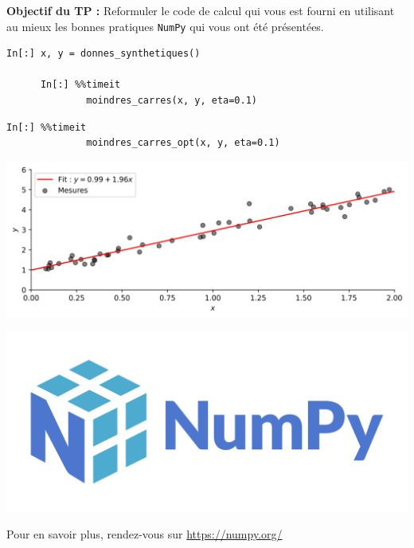 \documentclass[aspectratio=169]{beamer}
\begin{document}
\begin{frame}
  \vfill
  \textbf{Objectif du TP :} Reformuler le code de calcul qui vous est fourni en utilisant au mieux les bonnes pratiques \texttt{NumPy} qui vous ont été présentées.
  \vfill
\end{frame}




{
  \begin{frame}[fragile]{}{}
    \vfill
    \begin{lstlisting}[backgroundcolor=\color{white}, basicstyle=\ttfamily\footnotesize\color{black}]
      In[:] x, y = donnes_synthetiques()
      
      In[:] %%timeit
              moindres_carres(x, y, eta=0.1)
    \end{lstlisting}
    \hspace{1cm}
    \footnotesize{\texttt{}}
    
    \vfill
  \end{frame}
}

{
  \begin{frame}[fragile]{}{}
    \vfill
    \begin{lstlisting}[backgroundcolor=\color{white}, basicstyle=\ttfamily\footnotesize\color{black}]
      In[:] %%timeit
              moindres_carres_opt(x, y, eta=0.1)
    \end{lstlisting}
    \hspace{1cm}
    \footnotesize{\texttt{}}
    
    \vfill
  \end{frame}
}



{
  \begin{frame}[fragile]{}{}
    \vfill
    \centering
    \includegraphics[width=\textwidth]{least_squares_ex}
    \vfill
  \end{frame}
}

\begin{frame}
  \centering

  \includegraphics[width=.5\textwidth]{numpy_logo}

  Pour en savoir plus, rendez-vous sur \url{https://numpy.org/}
\end{frame}
\end{document}
